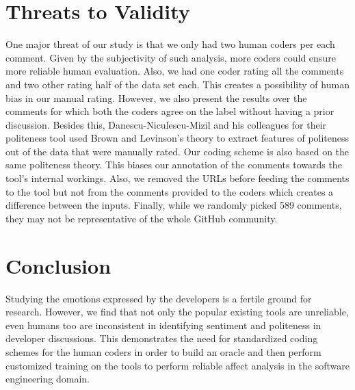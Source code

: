 \section{Threats to Validity}
One major threat of our study is 
that we only had two human coders 
per each comment. 
Given by the subjectivity of such analysis, 
more coders could ensure more reliable human evaluation.
Also, we had one coder rating all the comments 
and two other rating half of the data set each.
This creates a possibility of human bias 
in our manual rating.
However, we also present the results over the comments 
for which both the coders agree on the label 
without having a prior discussion.
Besides this, Danescu-Niculescu-Mizil and his colleagues 
for their politeness tool used Brown and Levinson's theory 
to extract features of politeness out of the data 
that were manually rated. 
Our coding scheme is also based on the same politeness theory. 
This biases our annotation of the comments 
towards the tool's internal workings. 
Also, 
we removed the URLs 
before feeding the comments to the tool 
but 
not from the comments provided to the coders 
which creates a difference between the inputs.
Finally, while we randomly picked 589 comments, they may not be representative of the whole GitHub community.

\section{Conclusion}
Studying the emotions expressed by the developers
is a fertile ground for research. 
However, we find that 
not only the popular existing tools are unreliable,
even humans too are inconsistent  
in identifying sentiment and politeness 
in developer discussions.
This demonstrates the need for 
standardized coding schemes 
for the human coders
in order to build an oracle
and then perform customized training 
on the tools
to perform reliable affect analysis
in the software engineering domain. 


